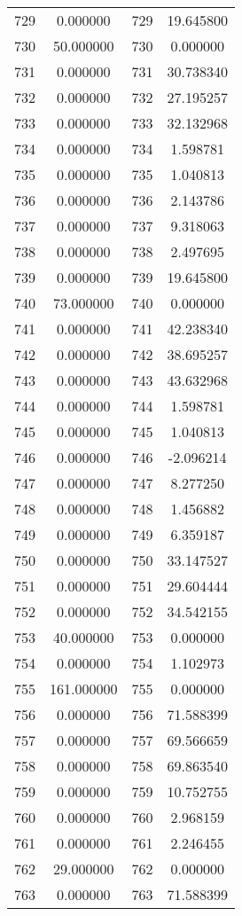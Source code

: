 \documentclass[12pt]{article}
\begin{document}
\begin{longtable}{@{}cccc@{}}
729 & 0.000000 & 729 & 19.645800 \\
730 & 50.000000 & 730 & 0.000000 \\
731 & 0.000000 & 731 & 30.738340 \\
732 & 0.000000 & 732 & 27.195257 \\
733 & 0.000000 & 733 & 32.132968 \\
734 & 0.000000 & 734 & 1.598781 \\
735 & 0.000000 & 735 & 1.040813 \\
736 & 0.000000 & 736 & 2.143786 \\
737 & 0.000000 & 737 & 9.318063 \\
738 & 0.000000 & 738 & 2.497695 \\
739 & 0.000000 & 739 & 19.645800 \\
740 & 73.000000 & 740 & 0.000000 \\
741 & 0.000000 & 741 & 42.238340 \\
742 & 0.000000 & 742 & 38.695257 \\
743 & 0.000000 & 743 & 43.632968 \\
744 & 0.000000 & 744 & 1.598781 \\
745 & 0.000000 & 745 & 1.040813 \\
746 & 0.000000 & 746 & -2.096214 \\
747 & 0.000000 & 747 & 8.277250 \\
748 & 0.000000 & 748 & 1.456882 \\
749 & 0.000000 & 749 & 6.359187 \\
750 & 0.000000 & 750 & 33.147527 \\
751 & 0.000000 & 751 & 29.604444 \\
752 & 0.000000 & 752 & 34.542155 \\
753 & 40.000000 & 753 & 0.000000 \\
754 & 0.000000 & 754 & 1.102973 \\
755 & 161.000000 & 755 & 0.000000 \\
756 & 0.000000 & 756 & 71.588399 \\
757 & 0.000000 & 757 & 69.566659 \\
758 & 0.000000 & 758 & 69.863540 \\
759 & 0.000000 & 759 & 10.752755 \\
760 & 0.000000 & 760 & 2.968159 \\
761 & 0.000000 & 761 & 2.246455 \\
762 & 29.000000 & 762 & 0.000000 \\
763 & 0.000000 & 763 & 71.588399 \\

\end{longtable}
\end{document}
